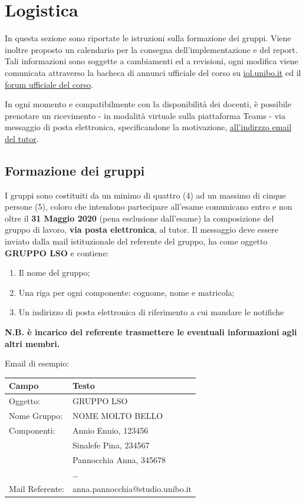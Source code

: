 \documentclass[
]{article}
\providecommand{\tightlist}{%
  \setlength{\itemsep}{0pt}\setlength{\parskip}{0pt}}
\begin{document}
\hypertarget{logistica}{%
\section{Logistica}\label{logistica}}

In questa sezione sono riportate le istruzioni sulla formazione dei
gruppi. Viene inoltre proposto un calendario per la consegna
dell'implementazione e del report. Tali informazioni sono soggette a
cambiamenti ed a revisioni, ogni modifica viene comunicata attraverso la
bacheca di annunci ufficiale del corso su \url{iol.unibo.it} ed il
\href{https://groups.google.com/forum/\#!forum/infoman-so}{forum
ufficiale del corso}.

In ogni momento e compatibilmente con la disponibilità dei docenti, è
possibile prenotare un ricevimento - in modalità virtuale sulla
piattaforma Teams - via messaggio di posta elettronica, specificandone
la motivazione, \href{mailto:stefanopio.zingaro@unibo.it}{all'indirzzo
email del tutor}.

\hypertarget{formazione-dei-gruppi}{%
\subsection{Formazione dei gruppi}\label{formazione-dei-gruppi}}

I gruppi sono costituiti da un minimo di quattro (4) ad un massimo di
cinque persone (5), coloro che intendono partecipare all'esame
comunicano entro e non oltre il \textbf{31 Maggio 2020} (pena esclusione
dall'esame) la composizione del gruppo di lavoro, \textbf{via posta
elettronica}, al tutor. Il messaggio deve essere inviato dalla mail
istituzionale del referente del gruppo, ha come oggetto \textbf{GRUPPO
LSO} e contiene:

\begin{enumerate}
\def\labelenumi{\arabic{enumi}.}
\tightlist
\item
  Il nome del gruppo;
\item
  Una riga per ogni componente: cognome, nome e matricola;
\item
  Un indirizzo di posta elettronica di riferimento a cui mandare le
  notifiche
\end{enumerate}

\textbf{N.B. è incarico del referente trasmettere le eventuali
informazioni agli altri membri.}

Email di esempio:

\begin{longtable}[]{@{}ll@{}}
\toprule
Campo & Testo\tabularnewline
\midrule
\endhead
Oggetto: & GRUPPO LSO\tabularnewline
Nome Gruppo: & NOME MOLTO BELLO\tabularnewline
Componenti: & Annio Ennio, 123456\tabularnewline
& Sinalefe Pina, 234567\tabularnewline
& Pannocchia Anna, 345678\tabularnewline
& \ldots{}\tabularnewline
Mail Referente: & anna.pannocchia@studio.unibo.it\tabularnewline
\bottomrule
\end{longtable}
\end{document}
